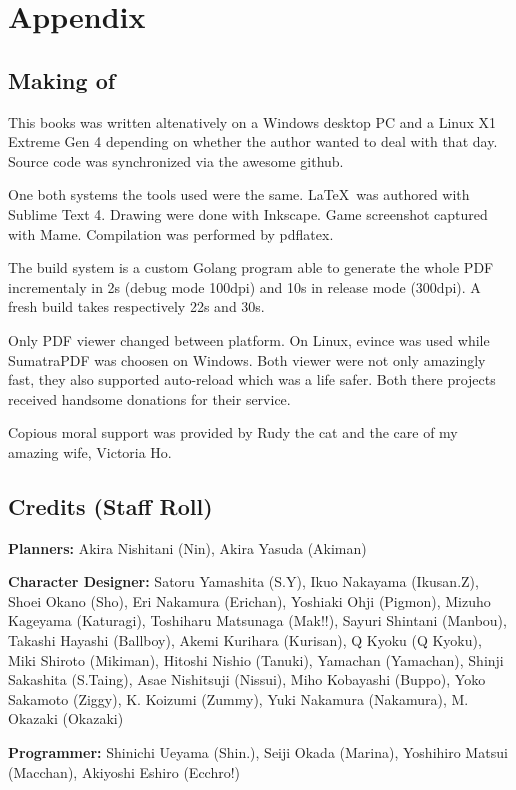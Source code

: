 \chapter{Appendix} 

\section{Making of}

This books was written altenatively on a Windows desktop PC and a Linux X1 Extreme Gen 4 depending on whether the author wanted to deal with  that day. Source code was synchronized via the awesome github.

One both systems the tools used were the same. \LaTeX\ was authored with Sublime Text 4. Drawing were done with Inkscape. Game screenshot captured with Mame. Compilation was performed by pdflatex.

The build system is a custom Golang program able to generate the whole PDF incrementaly in 2s (debug mode 100dpi) and 10s in release mode (300dpi). A fresh build takes respectively 22s and 30s.

Only PDF viewer changed between platform. On Linux, evince was used while SumatraPDF was choosen on Windows. Both viewer were not only amazingly fast, they also supported auto-reload which was a life safer. Both there projects received handsome donations for their service.

Copious moral support was provided by Rudy the cat and the care of my amazing wife, Victoria Ho.
\section{Credits (Staff Roll)}


\textbf{Planners:} Akira Nishitani (Nin), Akira Yasuda (Akiman)

\textbf{Character Designer:}  Satoru Yamashita (S.Y), Ikuo Nakayama (Ikusan.Z), Shoei Okano (Sho), Eri Nakamura (Erichan), Yoshiaki Ohji (Pigmon), Mizuho Kageyama (Katuragi), Toshiharu Matsunaga (Mak!!), Sayuri Shintani (Manbou), Takashi Hayashi (Ballboy), Akemi Kurihara (Kurisan), Q Kyoku (Q Kyoku), Miki Shiroto (Mikiman), Hitoshi Nishio (Tanuki), Yamachan (Yamachan), Shinji Sakashita (S.Taing), Asae Nishitsuji (Nissui), Miho Kobayashi (Buppo), Yoko Sakamoto (Ziggy), K. Koizumi (Zummy), Yuki Nakamura (Nakamura), M. Okazaki (Okazaki)

\textbf{Programmer:}  Shinichi Ueyama (Shin.), Seiji Okada (Marina), Yoshihiro Matsui (Macchan), Akiyoshi Eshiro (Ecchro!)

